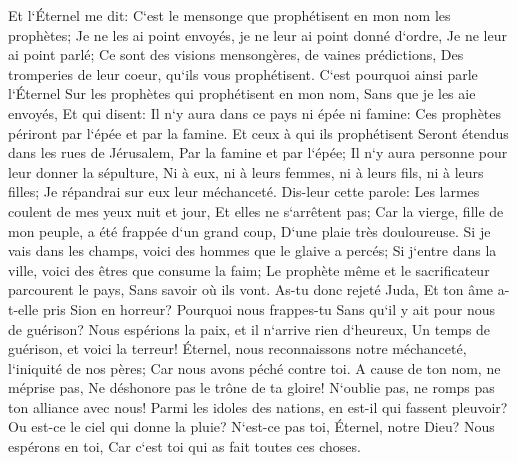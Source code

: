 \verse Et l`Éternel me dit: C`est le mensonge que prophétisent en mon nom les prophètes; Je ne les ai point envoyés, je ne leur ai point donné d`ordre, Je ne leur ai point parlé; Ce sont des visions mensongères, de vaines prédictions, Des tromperies de leur coeur, qu`ils vous prophétisent. 
\verse C`est pourquoi ainsi parle l`Éternel Sur les prophètes qui prophétisent en mon nom, Sans que je les aie envoyés, Et qui disent: Il n`y aura dans ce pays ni épée ni famine: Ces prophètes périront par l`épée et par la famine. 
\verse Et ceux à qui ils prophétisent Seront étendus dans les rues de Jérusalem, Par la famine et par l`épée; Il n`y aura personne pour leur donner la sépulture, Ni à eux, ni à leurs femmes, ni à leurs fils, ni à leurs filles; Je répandrai sur eux leur méchanceté. 
\verse Dis-leur cette parole: Les larmes coulent de mes yeux nuit et jour, Et elles ne s`arrêtent pas; Car la vierge, fille de mon peuple, a été frappée d`un grand coup, D`une plaie très douloureuse. 
\verse Si je vais dans les champs, voici des hommes que le glaive a percés; Si j`entre dans la ville, voici des êtres que consume la faim; Le prophète même et le sacrificateur parcourent le pays, Sans savoir où ils vont. 
\verse As-tu donc rejeté Juda, Et ton âme a-t-elle pris Sion en horreur? Pourquoi nous frappes-tu Sans qu`il y ait pour nous de guérison? Nous espérions la paix, et il n`arrive rien d`heureux, Un temps de guérison, et voici la terreur! 
\verse Éternel, nous reconnaissons notre méchanceté, l`iniquité de nos pères; Car nous avons péché contre toi. 
\verse A cause de ton nom, ne méprise pas, Ne déshonore pas le trône de ta gloire! N`oublie pas, ne romps pas ton alliance avec nous! 
\verse Parmi les idoles des nations, en est-il qui fassent pleuvoir? Ou est-ce le ciel qui donne la pluie? N`est-ce pas toi, Éternel, notre Dieu? Nous espérons en toi, Car c`est toi qui as fait toutes ces choses. 

